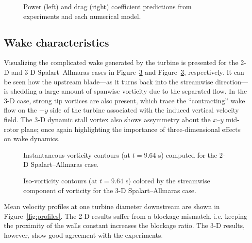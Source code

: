 \begin{figure}[ht]
    \centering


    \caption{Power (left) and drag (right) coefficient predictions from
        experiments and each numerical model.}

    \label{fig:perf-comp}
\end{figure}


\subsection{Wake characteristics}

Visualizing the complicated wake generated by the turbine is presented for the
2-D and 3-D Spalart--Allmaras cases in Figure~\ref{fig:vorticity-3D} and
Figure~\ref{fig:vorticity-3D}, respectively. It can be seen how the upstream
blade---as it turns back into the streamwise direction---is shedding a large
amount of spanwise vorticity due to the separated flow. In the 3-D case, strong
tip vortices are also present, which trace the ``contracting'' wake flow on the
$-y$ side of the turbine associated with the induced vertical velocity field.
The 3-D dynamic stall vortex also shows assymmetry about the $x$--$y$ mid-rotor
plane; once again highlighting the importance of three-dimensional effects on
wake dynamics.

\begin{figure}

    \caption{Instantaneous vorticity contours (at $t=9.64$ s) computed for the
        2-D Spalart--Allmaras case.}

    \label{fig:vorticity-2D}
\end{figure}

\begin{figure}
    \centering


    \caption{Iso-vorticity contours (at $t=9.64$ s) colored by the streamwise
        component of vorticity for the 3-D Spalart--Allmaras case.}

    \label{fig:vorticity-3D}
\end{figure}


Mean velocity profiles at one turbine diameter downstream are shown in
Figure~\ref{fig:profiles}. The 2-D results suffer from a blockage mismatch, i.e.
keeping the proximity of the walls constant increases the blockage ratio. The
3-D results, however, show good agreement with the experiments.


